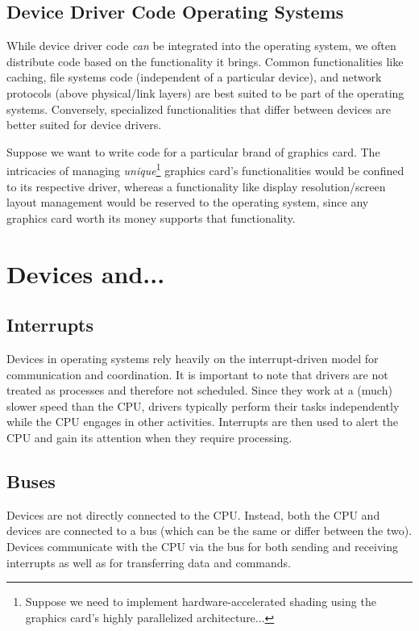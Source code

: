 \documentclass{report}
\newcommand{\exampleBegin}[1]{\begin{tcolorbox}[colback=blue!5!white,colframe=black!75!blue,title={Example:
      #1}]}
\newcommand{\exampleEnd}{\end{tcolorbox}}
\begin{document}
\subsection{Device Driver Code Operating Systems}
While device driver code \textit{can} be integrated into the operating system, we often distribute
code based on the functionality it brings. Common functionalities like caching, file systems code
(independent of a particular device), and network protocols (above physical/link layers) are best
suited to be part of the operating systems. Conversely, specialized functionalities that differ
between devices are better suited for device drivers.

\exampleBegin{Graphics Drivers}
Suppose we want to write code for a particular brand of graphics card. The intricacies of managing
\textit{unique}\footnote{Suppose we need to implement hardware-accelerated shading using the
  graphics card's highly parallelized architecture...} graphics card's functionalities would be
confined to its respective driver, whereas a functionality like display resolution/screen layout
management would be reserved to the operating system, since any graphics card worth its money
supports that functionality.
\exampleEnd





\section{Devices and...}
\subsection{Interrupts}
\label{subsec:INTER}
Devices in operating systems rely heavily on the interrupt-driven model for communication and
coordination. It is important to note that drivers are not treated as processes and therefore not
scheduled. Since they work at a (much) slower speed than the CPU, drivers typically perform their
tasks independently while the CPU engages in other activities. Interrupts are then used to alert the
CPU and gain its attention when they require processing.

\subsection{Buses}
Devices are not directly connected to the CPU. Instead, both the CPU and devices are connected to a
bus (which can be the same or differ between the two). Devices communicate with the CPU via the bus
for both sending and receiving interrupts as well as for transferring data and commands.
\end{document}
